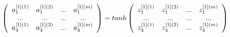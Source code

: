 \documentclass[a4paper]{article}
\begin{document}
\begin{align*}
\left( \begin{array} {c c c c}
a_1^{[1](1)} & a_1^{[1](2)} & ... & a_1^{[1](m)} \\
... & ... & ... & ... \\
a_4^{[1](1)} & a_4^{[1](2)} & ... & a_4^{[1](m)} \\
\end{array} \right)
=tanh \left( \begin{array} {c c c c}
z_1^{[1](1)} & z_1^{[1](2)} & ... & z_1^{[1](m)} \\
... & ... & ... & ... \\
z_4^{[1](1)} & z_4^{[1](2)} & ... & z_4^{[1](m)} \\
\end{array} \right)
\end{align*}
\end{document}
